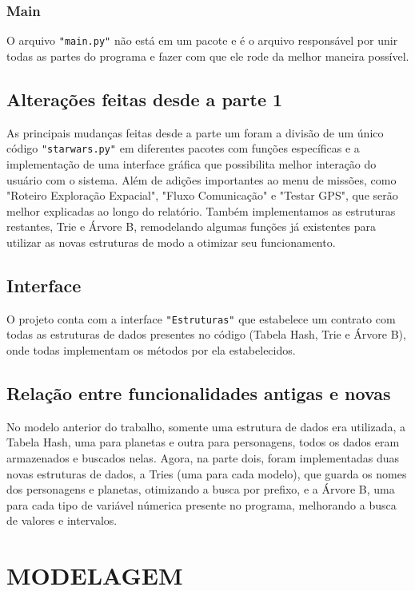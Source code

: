 \documentclass[12pt,a4paper]{article}
\begin{document}
\subsubsection{Main}
O arquivo \texttt{"main.py"} não está em um pacote e é o arquivo responsável por unir todas as partes do programa e fazer com que ele rode da melhor maneira possível.

\subsection{Alterações feitas desde a parte 1}
As principais mudanças feitas desde a parte um foram a divisão de um único código \texttt{"starwars.py"} em diferentes pacotes com funções específicas e a implementação de uma interface gráfica que possibilita melhor interação do usuário com o sistema. Além de adições importantes ao menu de missões, como "Roteiro Exploração Expacial", "Fluxo Comunicação" e "Testar GPS", que serão melhor explicadas ao longo do relatório. Também implementamos as estruturas restantes, Trie e Árvore B, remodelando algumas funções já existentes para utilizar as novas estruturas de modo a otimizar seu funcionamento.

\subsection{Interface}
O projeto conta com a interface \texttt{"Estruturas"} que estabelece um contrato com todas as estruturas de dados presentes no código (Tabela Hash, Trie e Árvore B), onde todas implementam os métodos por ela estabelecidos.

\subsection{Relação entre funcionalidades antigas e novas}
No modelo anterior do trabalho, somente uma estrutura de dados era utilizada, a Tabela Hash, uma para planetas e outra para personagens, todos os dados eram armazenados e buscados nelas. Agora, na parte dois, foram implementadas duas novas estruturas de dados, a Tries (uma para cada modelo), que guarda os nomes dos personagens e planetas, otimizando a busca por prefixo, e a Árvore B, uma para cada tipo de variável númerica presente no programa, melhorando a busca de valores e intervalos.

\section{MODELAGEM}
\end{document}
